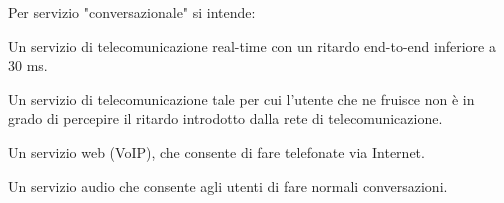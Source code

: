\question[1]
Per servizio "conversazionale" si intende:

\begin{checkboxes}
	\choice Un servizio di telecomunicazione real-time con un ritardo end-to-end inferiore a 30 ms.

	\CorrectChoice Un servizio di telecomunicazione tale per cui l'utente che ne fruisce non è in grado di percepire il ritardo introdotto dalla rete di telecomunicazione.

	\choice Un servizio web (VoIP), che consente di fare telefonate via Internet.

	\choice Un servizio audio che consente agli utenti di fare normali conversazioni.
\end{checkboxes}

